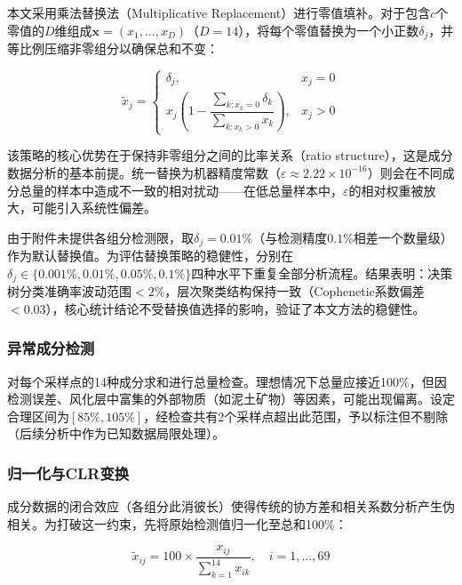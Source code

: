 \documentclass[12pt,a4paper]{ctexart}
\begin{document}
本文采用乘法替换法（Multiplicative Replacement）\cite{11}进行零值填补。对于包含$c$个零值的$D$维组成$\mathbf{x}=(x_1,\ldots,x_D)$（$D=14$），将每个零值替换为一个小正数$\delta_j$，并等比例压缩非零组分以确保总和不变：

\begin{equation}
    \tilde{x}_j = \begin{cases}
        \delta_j, & x_j = 0 \\[4pt]
        x_j\left(1 - \dfrac{\sum_{k: x_k=0}\delta_k}{\sum_{k: x_k>0}x_k}\right), & x_j > 0
    \end{cases}
    \label{eq:mult_replace}
\end{equation}

该策略的核心优势在于保持非零组分之间的比率关系（ratio structure），这是成分数据分析的基本前提\cite{2}。统一替换为机器精度常数（$\varepsilon\approx2.22\times10^{-16}$）则会在不同成分总量的样本中造成不一致的相对扰动——在低总量样本中，$\varepsilon$的相对权重被放大，可能引入系统性偏差。

由于附件未提供各组分检测限，取$\delta_j=0.01\%$（与检测精度$0.1\%$相差一个数量级）作为默认替换值。为评估替换策略的稳健性，分别在$\delta_j\in\{0.001\%,0.01\%,0.05\%,0.1\%\}$四种水平下重复全部分析流程。结果表明：决策树分类准确率波动范围$<2\%$，层次聚类结构保持一致（Cophenetic系数偏差$<0.03$），核心统计结论不受替换值选择的影响，验证了本文方法的稳健性。

\subsubsection{异常成分检测}

对每个采样点的14种成分求和进行总量检查。理想情况下总量应接近100\%，但因检测误差、风化层中富集的外部物质（如泥土矿物）等因素，可能出现偏离。设定合理区间为$[85\%,105\%]$，经检查共有2个采样点超出此范围，予以标注但不剔除（后续分析中作为已知数据局限处理）。

\subsubsection{归一化与CLR变换}

成分数据的闭合效应（各组分此消彼长）使得传统的协方差和相关系数分析产生伪相关\cite{2}。为打破这一约束，先将原始检测值归一化至总和100\%：

\begin{equation}
    \tilde{x}_{ij} = 100 \times \frac{x_{ij}}{\sum_{k=1}^{14} x_{ik}}, \quad i=1,\ldots,69
    \label{eq:normalize}
\end{equation}
\end{document}
